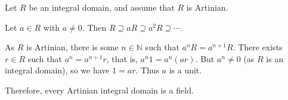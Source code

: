 \documentclass[12pt]{article}
\newcommand{\N}{\mathbb{N}}
\begin{document}

Let $R$ be an integral domain, and assume that $R$ is Artinian.

Let $a \in R$ with $a \neq 0$.
Then $R \supseteq aR \supseteq a^2R \supseteq \cdots$.

As $R$ is Artinian, there is some $n\in\N$ such that $a^nR=a^{n+1}R$.
There exists $r \in R$ such that $a^n=a^{n+1}r$,
that is, $a^n1=a^n(ar)$.
But $a^n \neq 0$ (as $R$ is an integral domain), so we have $1=ar$.
Thus $a$ is a unit.

Therefore, every Artinian integral domain is a field.
\end{document}
